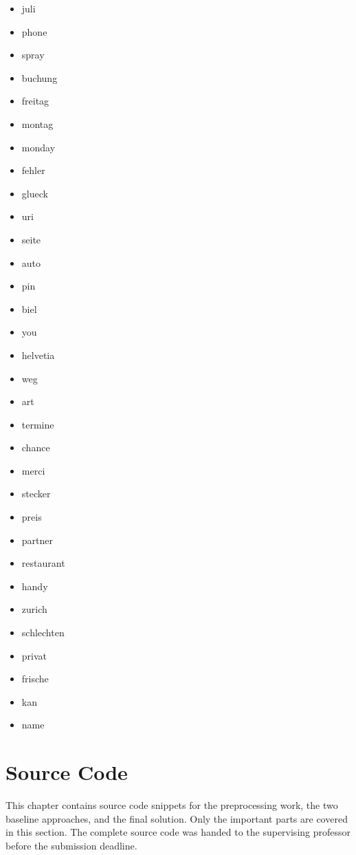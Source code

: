 \begin{multicols}{4}
\begin{itemize}
        \item juli
        \item phone
        \item spray
        \item buchung
        \item freitag
        \item montag
        \item monday
        \item fehler
        \item glueck
        \item uri
        \item seite
        \item auto
        \item pin
        \item biel
        \item you
        \item helvetia
        \item weg
        \item art
        \item termine
        \item chance
        \item merci
        \item stecker
        \item preis
        \item partner
        \item restaurant
        \item handy
        \item zurich
        \item schlechten
        \item privat
        \item frische
        \item kan
        \item name
    \end{itemize}
\end{multicols}

\chapter{Source Code}

This chapter contains source code snippets for the preprocessing work, the two baseline approaches, and the final solution.
Only the important parts are covered in this section. The complete source code was handed to the supervising professor
before the submission deadline.


